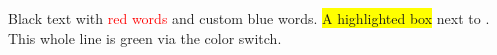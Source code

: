 \documentclass{article}
\begin{document}
Black text with \textcolor{red}{red words} and \textcolor{myblue}{custom blue words}.
\colorbox{yellow}{A highlighted box} next to .
{\color{green}This whole line is green via the color switch.}
\end{document}
